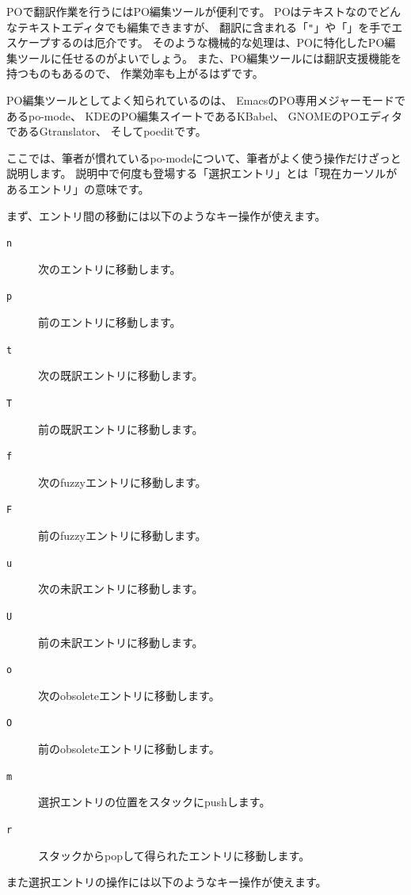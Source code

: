 \documentclass[mingoth,a4paper]{jsarticle}
\begin{document}
POで翻訳作業を行うにはPO編集ツールが便利です。
POはテキストなのでどんなテキストエディタでも編集できますが、
翻訳に含まれる「\verb!"!」や「\verb@\@」を手でエスケープするのは厄介です。
そのような機械的な処理は、POに特化したPO編集ツールに任せるのがよいでしょう。
また、PO編集ツールには翻訳支援機能を持つものもあるので、
作業効率も上がるはずです。

PO編集ツールとしてよく知られているのは、
EmacsのPO専用メジャーモードであるpo-mode、
KDEのPO編集スイートであるKBabel、
GNOMEのPOエディタであるGtranslator、
そしてpoeditです。

ここでは、筆者が慣れているpo-modeについて、筆者がよく使う操作だけざっと説明します。
説明中で何度も登場する「選択エントリ」とは「現在カーソルがあるエントリ」の意味です。

まず、エントリ間の移動には以下のようなキー操作が使えます。

\begin{description}
 \item[\texttt{n}] 次のエントリに移動します。
 \item[\texttt{p}] 前のエントリに移動します。
 \item[\texttt{t}] 次の既訳エントリに移動します。
 \item[\texttt{T}] 前の既訳エントリに移動します。
 \item[\texttt{f}] 次のfuzzyエントリに移動します。
 \item[\texttt{F}] 前のfuzzyエントリに移動します。
 \item[\texttt{u}] 次の未訳エントリに移動します。
 \item[\texttt{U}] 前の未訳エントリに移動します。
 \item[\texttt{o}] 次のobsoleteエントリに移動します。
 \item[\texttt{O}] 前のobsoleteエントリに移動します。
 \item[\texttt{m}] 選択エントリの位置をスタックにpushします。
 \item[\texttt{r}] スタックからpopして得られたエントリに移動します。
\end{description}

また選択エントリの操作には以下のようなキー操作が使えます。
\end{document}
